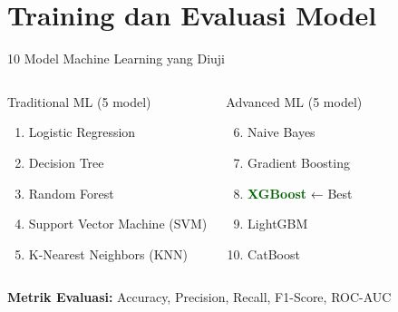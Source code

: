 \documentclass[aspectratio=169]{beamer}
\begin{document}
\section{Training dan Evaluasi Model}

\begin{frame}{10 Model Machine Learning yang Diuji}
\begin{columns}
\begin{block}{Traditional ML (5 model)}
\begin{enumerate}
    \item Logistic Regression
    \item Decision Tree
    \item Random Forest
    \item Support Vector Machine (SVM)
    \item K-Nearest Neighbors (KNN)
\end{enumerate}
\end{block}

\begin{block}{Advanced ML (5 model)}
\begin{enumerate}
    \setcounter{enumi}{5}
    \item Naive Bayes
    \item Gradient Boosting
    \item \textcolor{darkgreen}{\textbf{XGBoost}} ← Best
    \item LightGBM
    \item CatBoost
\end{enumerate}
\end{block}
\end{columns}

\vspace{0.5cm}
\begin{center}
\textbf{Metrik Evaluasi:} Accuracy, Precision, Recall, F1-Score, ROC-AUC
\end{center}
\end{frame}
\end{document}
